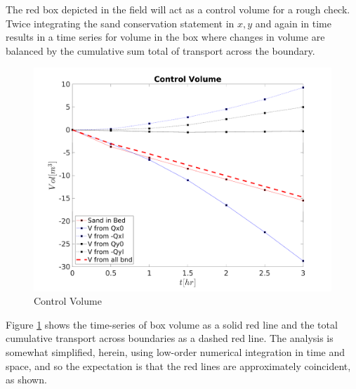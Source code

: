 \documentclass[12pt,oneside]{article}
\begin{document}
The red box depicted in the field will act as a control volume for a
rough check.  Twice integrating the sand conservation statement in
$x,y$ and again in time results in a time series for volume in the box
where changes in volume are balanced by the cumulative sum total of transport
across the boundary.
\begin{figure}
  \begin{center}
    \includegraphics[width=.8\linewidth]{./control_volnowavesedtrans.png}
  \end{center}
  \caption{Control Volume}
  \label{fig3}
\end{figure}
Figure \ref{fig3} shows the time-series of box volume as a solid red
line and the total cumulative transport across boundaries as a dashed
red line.  The analysis is somewhat simplified, herein, using low-order
numerical integration in time and space, and so the expectation is
that the red lines are approximately coincident, as shown.  
\clearpage
\end{document}

